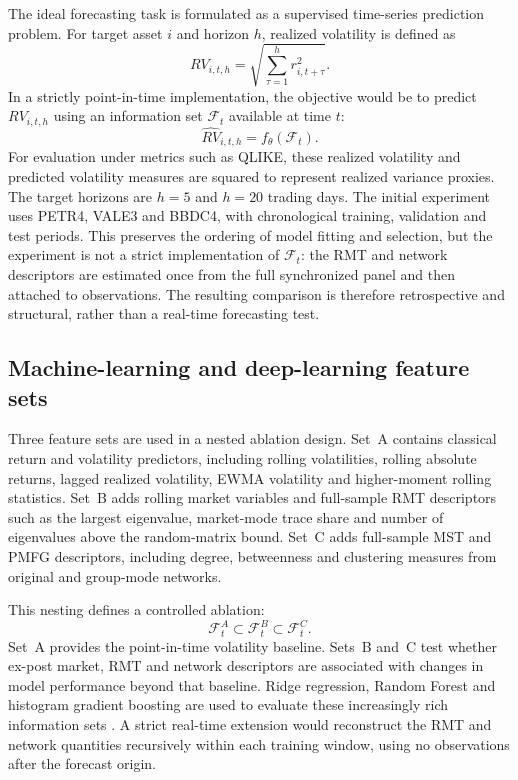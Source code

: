 The ideal forecasting task is formulated as a supervised time-series prediction problem. For target asset $i$ and horizon $h$, realized volatility is defined as
\begin{equation}
RV_{i,t,h}
=
\sqrt{
\sum_{\tau=1}^{h}
r_{i,t+\tau}^{2}
}.
\end{equation}
In a strictly point-in-time implementation, the objective would be to predict $RV_{i,t,h}$ using an information set $\mathcal{F}_t$ available at time $t$:
\begin{equation}
\widehat{RV}_{i,t,h}
=
f_{\theta}(\mathcal{F}_t).
\end{equation}
For evaluation under metrics such as QLIKE, these realized volatility and predicted volatility measures are squared to represent realized variance proxies. The target horizons are $h=5$ and $h=20$ trading days. The initial experiment uses PETR4, VALE3 and BBDC4, with chronological training, validation and test periods. This preserves the ordering of model fitting and selection, but the experiment is not a strict implementation of $\mathcal{F}_t$: the RMT and network descriptors are estimated once from the full synchronized panel and then attached to observations. The resulting comparison is therefore retrospective and structural, rather than a real-time forecasting test.

\subsection{Machine-learning and deep-learning feature sets}
\label{subsec:forecast_models_method}

Three feature sets are used in a nested ablation design. Set~A contains classical return and volatility predictors, including rolling volatilities, rolling absolute returns, lagged realized volatility, EWMA volatility and higher-moment rolling statistics. Set~B adds rolling market variables and full-sample RMT descriptors such as the largest eigenvalue, market-mode trace share and number of eigenvalues above the random-matrix bound. Set~C adds full-sample MST and PMFG descriptors, including degree, betweenness and clustering measures from original and group-mode networks.

This nesting defines a controlled ablation:
\begin{equation}
\mathcal{F}^{A}_{t}
\subset
\mathcal{F}^{B}_{t}
\subset
\mathcal{F}^{C}_{t}.
\end{equation}
Set~A provides the point-in-time volatility baseline. Sets~B and~C test whether ex-post market, RMT and network descriptors are associated with changes in model performance beyond that baseline. Ridge regression, Random Forest and histogram gradient boosting are used to evaluate these increasingly rich information sets \cite{hoerl_kennard_1970_ridge,breiman_2001_random,friedman_2001_greedy}. A strict real-time extension would reconstruct the RMT and network quantities recursively within each training window, using no observations after the forecast origin.

